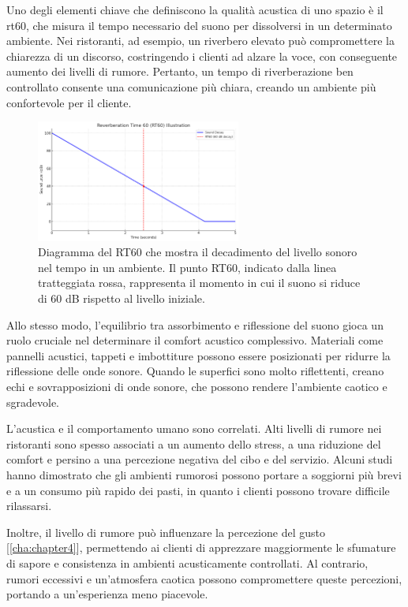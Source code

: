 Uno degli elementi chiave che definiscono la qualità acustica di uno spazio è il \gls{rt60}, che misura il tempo necessario del suono per dissolversi in un determinato ambiente. Nei ristoranti, ad esempio, un riverbero elevato può compromettere la chiarezza di un discorso, costringendo i clienti ad alzare la voce, con conseguente aumento dei livelli di rumore. Pertanto, un tempo di riverberazione ben controllato consente una comunicazione più chiara, creando un ambiente più confortevole per il cliente.

\begin{figure}[H]
      \centering
      \includegraphics[width=0.6\textwidth]{Chapters/Figures/RT60.png}
      \caption{\small Diagramma del RT60 che mostra il decadimento del livello sonoro nel tempo in un ambiente. Il punto RT60, indicato dalla linea tratteggiata rossa, rappresenta il momento in cui il suono si riduce di 60 dB rispetto al livello iniziale.}
      \label{fig:RT60}
\end{figure}

Allo stesso modo, l'equilibrio tra assorbimento e riflessione del suono gioca un ruolo cruciale nel determinare il comfort acustico complessivo. Materiali come pannelli acustici, tappeti e imbottiture possono essere posizionati per ridurre la riflessione delle onde sonore. Quando le superfici sono molto riflettenti, creano echi e sovrapposizioni di onde sonore, che possono rendere l'ambiente caotico e sgradevole.

L'acustica e il comportamento umano sono correlati. Alti livelli di rumore nei ristoranti sono spesso associati a un aumento dello stress, a una riduzione del comfort e persino a una percezione negativa del cibo e del servizio. Alcuni studi hanno dimostrato che gli ambienti rumorosi possono portare a soggiorni più brevi e a un consumo più rapido dei pasti, in quanto i clienti possono trovare difficile rilassarsi. \cite{gbacoustics2023}

Inoltre, il livello di rumore può influenzare la percezione del gusto [\ref{cha:chapter4}], permettendo ai clienti di apprezzare maggiormente le sfumature di sapore e consistenza in ambienti acusticamente controllati. Al contrario, rumori eccessivi e un’atmosfera caotica possono compromettere queste percezioni, portando a un’esperienza meno piacevole.


